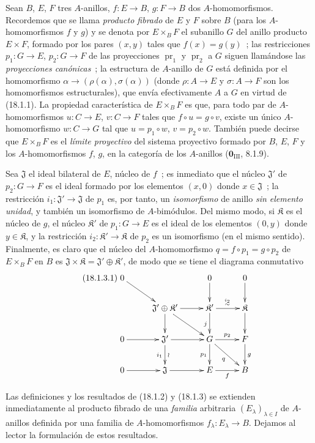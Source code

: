 \begin{env}[18.1.2]
\label{0.18.1.2-fr}
Sean $B$, $E$, $F$ tres $A$-anillos, $f:E\to B$, $g:F\to B$ dos
$A$-homomorfismos. Recordemos que se llama \emph{producto fibrado} de $E$ y
$F$ sobre $B$ (para los $A$-homomorfismos $f$ y $g$) y se denota por
$E\times_BF$ el subanillo $G$ del anillo producto $E\times F$, formado por los
pares $(x,y)$ tales que $f(x)=g(y)$~; las restricciones $p_1:G\to E$,
$p_2:G\to F$ de las proyecciones $\operatorname{pr}_1$ y
$\operatorname{pr}_2$ a $G$ siguen llamándose las \emph{proyecciones
canónicas}~; la estructura de $A$-anillo de $G$ está definida por
el homomorfismo $\alpha\to(\rho(\alpha),\sigma(\alpha))$ (donde
$\rho:A\to E$ y $\sigma:A\to F$ son los homomorfismos estructurales), que
envía efectivamente $A$ a $G$ en virtud de (18.1.1). La propiedad
característica de $E\times_BF$ es que, para todo par de
$A$-homomorfismos $u:C\to E$, $v:C\to F$ tales que
$f\circ u=g\circ v$, existe un único $A$-homomorfismo $w:C\to G$
tal que $u=p_1\circ w$, $v=p_2\circ w$. También puede decirse que
$E\times_BF$ es el \emph{límite proyectivo} del sistema proyectivo formado por $B$,
$E$, $F$ y los $A$-homomorfismos $f$, $g$, en la categoría de los
$A$-anillos ($\mathbf{0}_{\mathrm{III}}$, 8.1.9).
\end{env}

\begin{env}[18.1.3]
\label{0.18.1.3-fr}
Sea $\mathfrak{J}$ el ideal bilateral de $E$, núcleo de $f$~; es inmediato
que el núcleo $\mathfrak{J}'$ de $p_2:G\to F$ es el ideal formado por los elementos
$(x,0)$ donde $x\in\mathfrak{J}$~; la restricción
$i_1:\mathfrak{J}'\to\mathfrak{J}$ de $p_1$ es, por tanto, un
\emph{isomorfismo} de anillo \emph{sin elemento unidad}, y también un
isomorfismo de $A$-bimódulos. Del mismo modo, si $\mathfrak{K}$ es el núcleo de
$g$, el núcleo $\mathfrak{K}'$ de $p_1:G\to E$ es el ideal de los elementos
$(0,y)$ donde $y\in\mathfrak{K}$, y la restricción
$i_2:\mathfrak{K}'\to\mathfrak{K}$ de $p_2$ es un isomorfismo (en el mismo
sentido). Finalmente, es claro que el núcleo del $A$-homomorfismo
$q=f\circ p_1=g\circ p_2$ de $E\times_BF$ en $B$ es
$\mathfrak{J}\times\mathfrak{K}=\mathfrak{J}'\oplus\mathfrak{K}'$, de modo
que se tiene el diagrama conmutativo
\begin{equation}
\label{0.18.1.3.1-fr}
\tag{18.1.3.1}
  \xymatrix@C=2.2pc@R=1.8pc{
    0\ar[dr] & & 0\ar[d] & 0\ar[d]\\
    & \mathfrak{J}'\oplus\mathfrak{K}'\ar[r]\ar[d]\ar[dr]
      & \mathfrak{K}'\ar[r]^{\overset{i_2}{\sim}}\ar[d]_j
      & \mathfrak{K}\ar[d]\\
    0\ar[r] & \mathfrak{J}'\ar[r]\ar[d]_{i_1}^{\wr}
      & G\ar[r]^{p_2}\ar[d]_{p_1}\ar[dr]_q & F\ar[d]^g\\
    0\ar[r] & \mathfrak{J}\ar[r] & E\ar[r]_f & B
  }
\end{equation}

Las definiciones y los resultados de (18.1.2) y (18.1.3) se extienden inmediatamente al
producto fibrado de una \emph{familia} arbitraria $(E_\lambda)_{\lambda\in I}$ de
$A$-anillos definida por una familia de $A$-homomorfismos
$f_\lambda:E_\lambda\to B$. Dejamos al lector la formulación de estos resultados.
\end{env}


